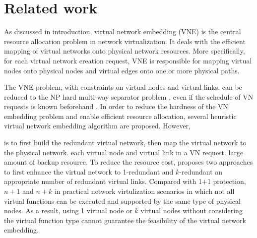 \section{Related work}
\label{sec:RELATED_WORK}
As discussed in introduction, virtual network embedding (VNE) is the central resource allocation problem in network virtualization. It deals with the efficient mapping of virtual networks onto physical network resources. More specifically, for each virtual network creation request, VNE is responsible for mapping virtual nodes onto physical nodes and virtual edges onto one or more physical paths.

The VNE problem, with constraints on virtual nodes and virtual links,  can be reduced to the NP hard multi-way separator problem \cite{yu2008rethinking}, even if the schedule of VN requests is known beforehand \cite{herrera2016resource}. In order to reduce the hardness of the VN embedding problem and enable efficient resource allocation, several heuristic virtual network embedding algorithm are proposed.  However, 

 is to first build the redundant virtual network, then map the virtual network to the physical network.  each virtual node and virtual link in a VN request. large amount of backup resource. To reduce the resource cost, \cite{yeow2010designing,yu2011cost} proposes two approaches to first enhance the  virtual network to 1-redundant and $k$-redundant  an appropriate number of redundant virtual links. Compared with 1+1 protection, $n+1$ and $n+k$     in practical network virtulization scenarios in which not all virtual functions can be executed and supported by the same type of  physical nodes. As a result, using  1 virtual node  or $k$ virtual nodes without considering the virtual function type cannot guarantee the feasibility of the virtual network embedding. 

